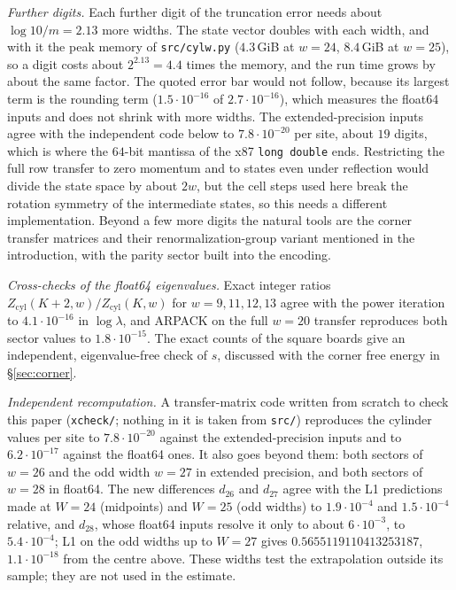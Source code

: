 \documentclass[11pt]{amsart}
\theoremstyle{definition}
\theoremstyle{remark}
\newcommand{\file}[1]{\texttt{#1}}
\begin{document}
\emph{Further digits.} Each further digit of the truncation error needs about $\log 10/m = 2.13$
more widths. The state vector doubles with each width, and with it the peak memory of
\file{src/cylw.py} ($4.3$\,GiB at $w = 24$, $8.4$\,GiB at $w = 25$), so a digit costs about
$2^{2.13} = 4.4$ times the memory, and the run time grows by about the same factor. The quoted error
bar would not follow, because its largest term is the rounding term ($1.5\cdot10^{-16}$ of
$2.7\cdot10^{-16}$), which measures the float64 inputs and does not shrink with more widths. The
extended-precision inputs agree with the independent code below to $7.8\cdot10^{-20}$ per site, about
$19$ digits, which is where the $64$-bit mantissa of the x87 \texttt{long double} ends. Restricting the full row transfer to zero momentum and to states even under reflection would
divide the state space by about $2w$, but the cell steps used here break the rotation symmetry of the
intermediate states, so this needs a different implementation. Beyond a few more digits the natural
tools are the corner transfer matrices and their renormalization-group variant mentioned in the
introduction, with the parity sector built into the encoding.

\emph{Cross-checks of the float64 eigenvalues.} Exact integer ratios
$Z_{\mathrm{cyl}}(K+2, w)/Z_{\mathrm{cyl}}(K, w)$ for $w = 9, 11, 12, 13$ agree with the power
iteration to $4.1\cdot10^{-16}$ in $\log \lambda$, and ARPACK on the full $w = 20$ transfer
reproduces both sector values to $1.8\cdot10^{-15}$. The exact counts of the square boards give an
independent, eigenvalue-free check of $s$, discussed with the corner free energy in
\S\ref{sec:corner}.

\emph{Independent recomputation.} A transfer-matrix code written from scratch to check this paper
(\file{xcheck/}; nothing in it is taken from \file{src/}) reproduces the cylinder values per site to
$7.8\cdot10^{-20}$ against the extended-precision inputs and to $6.2\cdot10^{-17}$ against the float64
ones. It also goes beyond them: both sectors of $w = 26$ and the odd width $w = 27$ in extended
precision, and both sectors of $w = 28$ in float64. The new differences $d_{26}$ and $d_{27}$ agree
with the L1 predictions made at $W = 24$ (midpoints) and $W = 25$ (odd widths) to $1.9\cdot10^{-4}$ and
$1.5\cdot10^{-4}$ relative, and $d_{28}$, whose float64 inputs resolve it only to about
$6\cdot10^{-3}$, to $5.4\cdot10^{-4}$; L1 on the odd widths up to
$W = 27$ gives $0.5655119110413253187$, $1.1\cdot10^{-18}$ from the centre above. These widths test the
extrapolation outside its sample; they are not used in the estimate.
\end{document}
